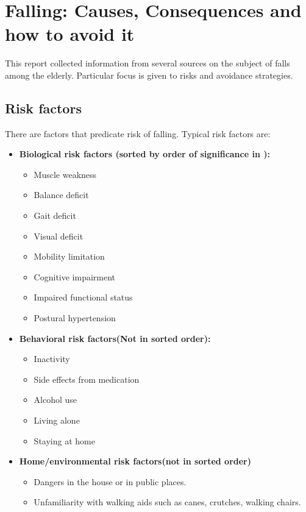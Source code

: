 
\section{Falling: Causes, Consequences and how to avoid it}
This report collected information from several sources on the subject of falls among the elderly. Particular focus is given to risks and avoidance strategies.

\subsection{Risk factors}

There are factors that predicate risk of falling. Typical risk factors are:
\begin{itemize}
\item 
\textbf{Biological risk factors (sorted by order of significance in  \cite{fallsRubenstein}):}
\begin{itemize}
\item Muscle weakness
\item Balance deficit
\item Gait deficit
\item Visual deficit
\item Mobility limitation
\item Cognitive impairment
\item Impaired functional status
\item Postural hypertension
\end{itemize}
\item 
\textbf{Behavioral risk factors(Not in sorted order):}
\begin{itemize}
\item Inactivity
\item Side effects from medication
\item Alcohol use
\item Living alone
\item Staying at home
\end{itemize}
\item 
\textbf{Home/environmental risk factors(not in sorted order)}
\begin{itemize}
\item Dangers in the house or in public places.
\item Unfamiliarity with walking aids such as canes, crutches, walking chairs.
\end{itemize}
\end{itemize}

